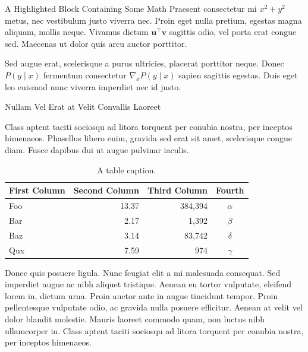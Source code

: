 \documentclass[final]{beamer}
\newlength{\colwidth}
\begin{document}
\begin{frame}[t]
\begin{columns}[t]
\begin{column}{\colwidth}
\begin{exampleblock}{A Highlighted Block Containing Some Math}
    Praesent consectetur mi $x^2 + y^2$ metus, nec vestibulum justo viverra
    nec. Proin eget nulla pretium, egestas magna aliquam, mollis neque. Vivamus
    dictum $\mathbf{u}^\intercal\mathbf{v}$ sagittis odio, vel porta erat
    congue sed. Maecenas ut dolor quis arcu auctor porttitor.


    Sed augue erat, scelerisque a purus ultricies, placerat porttitor neque.
    Donec $P(y \mid x)$ fermentum consectetur $\nabla_x P(y \mid x)$ sapien
    sagittis egestas. Duis eget leo euismod nunc viverra imperdiet nec id
    justo.

  \end{exampleblock}

  \begin{block}{Nullam Vel Erat at Velit Convallis Laoreet}

    Class aptent taciti sociosqu ad litora torquent per conubia nostra, per
    inceptos himenaeos. Phasellus libero enim, gravida sed erat sit amet,
    scelerisque congue diam. Fusce dapibus dui ut augue pulvinar iaculis.

    \begin{table}
      \centering
      \begin{tabular}{l r r c}
        \toprule
        \textbf{First Column} & \textbf{Second Column} & \textbf{Third Column} & \textbf{Fourth} \\
        \midrule
        Foo & 13.37 & 384,394 & $\alpha$ \\
        Bar & 2.17 & 1,392 & $\beta$ \\
        Baz & 3.14 & 83,742 & $\delta$ \\
        Qux & 7.59 & 974 & $\gamma$ \\
        \bottomrule
      \end{tabular}
      \caption{A table caption.}
    \end{table}

    Donec quis posuere ligula. Nunc feugiat elit a mi malesuada consequat. Sed
    imperdiet augue ac nibh aliquet tristique. Aenean eu tortor vulputate,
    eleifend lorem in, dictum urna. Proin auctor ante in augue tincidunt
    tempor. Proin pellentesque vulputate odio, ac gravida nulla posuere
    efficitur. Aenean at velit vel dolor blandit molestie. Mauris laoreet
    commodo quam, non luctus nibh ullamcorper in. Class aptent taciti sociosqu
    ad litora torquent per conubia nostra, per inceptos himenaeos.


\end{block}
\end{column}
\end{columns}
\end{frame}
\end{document}
